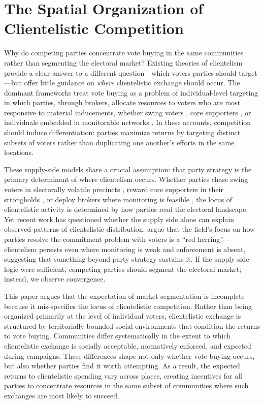 \documentclass[12pt,letterpaper]{article}
\begin{document}
\section{The Spatial Organization of Clientelistic Competition}

Why do competing parties concentrate vote buying in the same communities rather than segmenting the electoral market? Existing theories of clientelism provide a clear answer to a different question---which voters parties should target---but offer little guidance on \textit{where} clientelistic exchange should occur. The dominant frameworks treat vote buying as a problem of individual-level targeting in which parties, through brokers, allocate resources to voters who are most responsive to material inducements, whether swing voters \citep{stokes2005perverse, dixit1996determinants}, core supporters \citep{cox1986electoral, nichter2008vote}, or individuals embedded in monitorable networks \citep{stokes2013brokers, larreguy2016parties}. In these accounts, competition should induce differentiation: parties maximize returns by targeting distinct subsets of voters rather than duplicating one another's efforts in the same locations.

These supply-side models share a crucial assumption: that party strategy is the primary determinant of where clientelism occurs. Whether parties chase swing voters in electorally volatile precincts \citep{magaloni2007clientelism, kitschelt2007patrons}, reward core supporters in their strongholds \citep{cox1986electoral, nichter2008vote}, or deploy brokers where monitoring is feasible \citep{stokes2013brokers, larreguy2016parties}, the locus of clientelistic activity is determined by how parties read the electoral landscape. Yet recent work has questioned whether the supply side alone can explain observed patterns of clientelistic distribution. \citet{hicken2020red} argue that the field's focus on how parties resolve the commitment problem with voters is a ``red herring''---clientelism persists even where monitoring is weak and enforcement is absent, suggesting that something beyond party strategy sustains it. If the supply-side logic were sufficient, competing parties should segment the electoral market; instead, we observe convergence.

This paper argues that the expectation of market segmentation is incomplete because it mis-specifies the locus of clientelistic competition. Rather than being organized primarily at the level of individual voters, clientelistic exchange is structured by territorially bounded social environments that condition the returns to vote buying. Communities differ systematically in the extent to which clientelistic exchange is socially acceptable, normatively enforced, and expected during campaigns. These differences shape not only whether vote buying occurs, but also whether parties find it worth attempting. As a result, the expected returns to clientelistic spending vary across places, creating incentives for all parties to concentrate resources in the same subset of communities where such exchanges are most likely to succeed.
\end{document}
